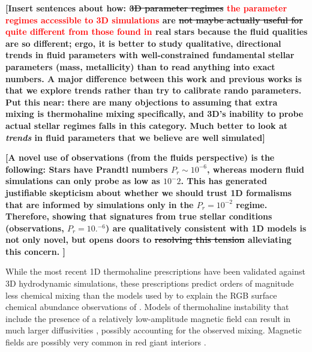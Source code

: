 %

\textbf{[Insert sentences about how:
\sout{3D parameter regimes} \textcolor{red}{the parameter regimes accessible to 3D simulations} are \sout{not maybe actually useful for} \textcolor{red}{quite different from those found in} real stars because the fluid qualities are so different; ergo, it is better to study qualitative, directional trends in fluid parameters with well-constrained fundamental stellar parameters (mass, metallicity) than to read anything into exact numbers. A major difference between this work and previous works is that we explore trends rather than try to calibrate rando parameters. Put this near: there are many objections to assuming that extra mixing is thermohaline mixing specifically, and 3D's inability to probe actual stellar regimes falls in this category. Much better to look at \textit{trends} in fluid parameters that we believe are well simulated]}

\textbf{[A novel use of observations (from the fluids perspective) is the following: Stars have Prandtl numbers $P_r \sim 10^{-6}$, whereas modern fluid simulations can only probe as low as $10^-2$. This has generated justifiable skepticism about whether we should trust 1D formalisms that are informed by simulations only in the $P_r = 10^{-2}$ regime. Therefore, showing that signatures from true stellar conditions (observations, $P_r = 10.^{-6}$) are qualitatively consistent with 1D models is not only novel, but opens doors to \sout{resolving this tension} alleviating this concern. ]}

While the most recent 1D thermohaline prescriptions \citep[e.g.~][]{traxler_etal_2011,brown_etal_2013} have been validated against 3D hydrodynamic simulations, these prescriptions predict orders of magnitude less chemical mixing than the models used by \citet{charbonnel_thermohaline_2007} to explain the RGB surface chemical abundance observations of \citet{Gratton2000} \citep[see Sec.~3.1 of][]{traxler_etal_2011}. 
Models of thermohaline instability that include the presence of a relatively low-amplitude magnetic field can result in much larger diffusivities \citep{harrington}, possibly accounting for the observed mixing. Magnetic fields are possibly very common in red giant interiors \citep{Fuller2015,Stello:2016}. 

